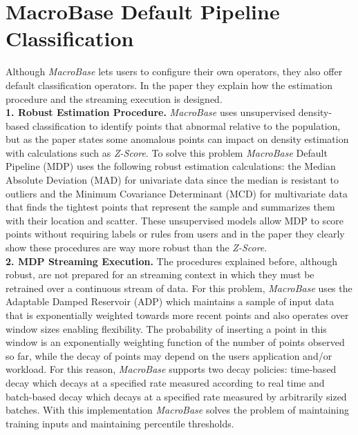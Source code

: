 \documentclass[11pt, titlepage]{article}
\begin{document}
	\section{MacroBase Default Pipeline Classification}
	\begin{flushleft}
		Although \textit{MacroBase} lets users to configure their own operators, they also offer default classification operators. In the paper they explain how the estimation procedure and the streaming execution is designed.
		\\\textbf{1. Robust Estimation Procedure.} \textit{MacroBase} uses unsupervised density-based classification to identify points that abnormal relative to the population, but as the paper states some anomalous points can impact on density estimation with calculations such as \textit{Z-Score}. To solve this problem \textit{MacroBase} Default Pipeline (MDP) uses the following robust estimation calculations: the Median Absolute Deviation (MAD) for univariate data since the median is resistant to outliers and the Minimum Covariance Determinant (MCD) for multivariate data that finds the tightest points that represent the sample and summarizes them with their location and scatter. These unsupervised models allow MDP to score points without requiring labels or rules from users and in the paper they clearly show these procedures are way more robust than the \textit{Z-Score}.
		\\\textbf{2. MDP Streaming Execution.} The procedures explained before, although robust, are not prepared for an streaming context in which they must be retrained over a continuous stream of data. For this problem, \textit{MacroBase} uses the Adaptable Damped Reservoir (ADP) which maintains a sample of input data that is exponentially weighted towards more recent points and also operates over window sizes enabling flexibility. The probability of inserting a point in this window is an exponentially weighting function of the number of points observed so far, while the decay of points may depend on the users application and/or workload. For this reason, \textit{MacroBase} supports two decay policies: time-based decay which decays at a specified rate measured according to real time and batch-based decay which decays at a specified rate measured by arbitrarily sized batches. With this implementation \textit{MacroBase} solves the problem of maintaining training inputs and maintaining percentile thresholds.
	\end{flushleft}
\end{document}
